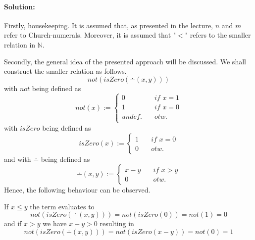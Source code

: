 \documentclass{article}
\begin{document}
\paragraph{Solution:} Firstly, housekeeping. It is assumed that, as presented in the lecture, $\overline{n}$ and $\overline{m}$ refer to Church-numerals. Moreover, it is assumed that "$<$" refers to the smaller relation in $\mathbb{N}$.

Secondly, the general idea of the presented approach will be discussed. We shall construct the smaller relation as follows. 
\begin{equation*}
\textit{not}(\textit{isZero}(\dotminus (x,y)))
\end{equation*}
with  $\textit{not}$ being defined as 
\begin{equation*}
\textit{not}(x):=
\begin{cases}
0 \quad &\textit{if }x=1 \\
1 \quad &\textit{if }x=0 \\
undef. \quad &\textit{otw.} \\
\end{cases}
\end{equation*}
with $\textit{isZero}$ being defined as 
\begin{equation*}
\textit{isZero}(x):=
\begin{cases}
1 \quad &\textit{if }x=0 \\
0 \quad &\textit{otw.}
\end{cases}
\end{equation*}
and with $\dotminus$ being defined as 
\begin{equation*}
\dotminus(x,y):=
\begin{cases}
x-y \quad &\textit{if }x>y \\
0 \quad &\textit{otw.}
\end{cases}
\end{equation*}
Hence, the following behaviour can be observed. 

If $x \leq y$ the term evaluates to 
\begin{equation*}
\textit{not}(\textit{isZero}(\dotminus (x,y)))= \textit{not}(\textit{isZero}(0)) =  \textit{not}(1) =  0  
\end{equation*}
and if $x>y$ we have $x-y>0$ resulting in
\begin{equation*}
\textit{not}(\textit{isZero}(\dotminus (x,y)))= \textit{not}(\textit{isZero}(x-y)) =  \textit{not}(0) = 1  
\end{equation*}
\end{document}
